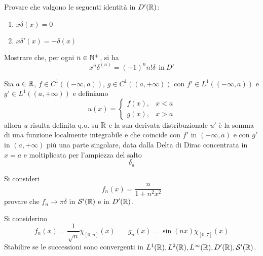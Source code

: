 Provare che valgono le seguenti identità in $D'(\mathbb{R} )$:
\begin{enumerate}
\item $x\delta ( x) =0$
\item $x\delta '( x) =-\delta ( x)$
\end{enumerate}

Mostrare che, per ogni $n\in \mathbb{N} ^{+}$, si ha
\begin{equation*}
\boxed{x^{n} \delta ^{( n)} =( -1)^{n} n!\delta \ \ \text{in} \ D'}
\end{equation*}

Sia $a\in \mathbb{R} $, $f\in C^{1}(( -\infty ,a))$, $g\in C^{1}(( a,+\infty ))$ con $f'\in L^{1}(( -\infty ,a))$ e $g'\in L^{1}(( a,+\infty ))$ e definiamo
\begin{equation*}
u( x) =\begin{cases}
f( x) , & x< a\\
g( x) , & x >a
\end{cases}
\end{equation*}
allora $u$ risulta definita q.o. su $\mathbb{R} $ e la sua derivata distribuzionale $u'$ è la somma di una funzione localmente integrabile e che coincide con $f'$ in $( -\infty ,a)$ e con $g'$ in $( a,+\infty )$ più una parte singolare, data dalla Delta di Dirac concentrata in $x=a$ e moltiplicata per l'ampiezza del salto
\begin{equation*}
[ u( a_{+}) -u( a_{-})] \delta _{a}
\end{equation*}
\Esercizio{}

Si consideri
\begin{equation*}
f_{n}( x) =\frac{n}{1+n^{2} x^{2}}
\end{equation*}
provare che $f_{n}\rightarrow \pi \delta $ in $\mathcal{S}  '(\mathbb{R} )$ e in $D'(\mathbb{R} )$.
\Esercizio{}

Si considerino
\begin{equation*}
f_{n}( x) =\frac{1}{\sqrt{n}} \chi _{[ 0,n]}( x) \ \ \ \ \ \ \ \ g_{n}( x) =\sin( nx) \chi _{[ 0,7]}( x)
\end{equation*}
Stabilire se le successioni sono convergenti in $L^{1}(\mathbb{R} ) ,L^{2}(\mathbb{R} ) ,L^{\infty }(\mathbb{R} ) ,D'(\mathbb{R} ) ,\mathcal{S}  '(\mathbb{R} )$.
\Esercizio{}


